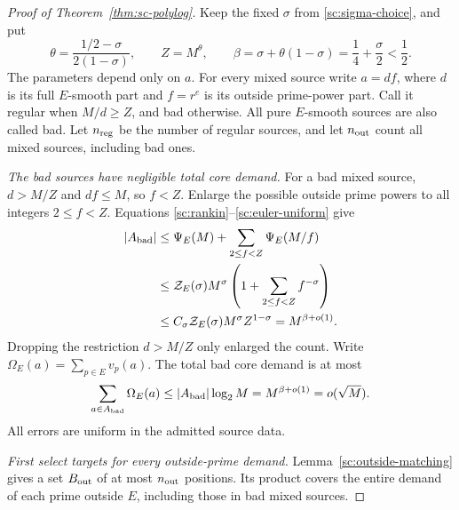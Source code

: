 \begin{proof}[Proof of Theorem~\ref{thm:sc-polylog}]
Keep the fixed \(\sigma\) from \eqref{sc:sigma-choice}, and put
\begin{equation}
 \theta=\frac{1/2-\sigma}{2(1-\sigma)},\qquad
 Z=M^\theta,\qquad
 \beta=\sigma+\theta(1-\sigma)=\frac14+\frac{\sigma}{2}<\frac12.
 \label{sc:cutoff}
\end{equation}
The parameters depend only on \(a\).
For every mixed source write \(a=d f\), where \(d\) is its full
\(E\)-smooth part and \(f=r^e\) is its outside prime-power part.
Call it regular when \(M/d\ge Z\), and bad otherwise.
All pure \(E\)-smooth sources are also called bad.
Let \(n_{\rm reg}\) be the number of regular sources, and let
\(n_{\rm out}\) count all mixed sources, including bad ones.

\emph{The bad sources have negligible total core demand.}
For a bad mixed source, \(d>M/Z\) and \(df\le M\), so \(f<Z\).
Enlarge the possible outside prime powers to all integers
\(2\le f<Z\). Equations \eqref{sc:rankin}--\eqref{sc:euler-uniform}
give
\begin{equation}
 \begin{split}
 |A_{\rm bad}|
 &\le\Psi_E(M)+\sum_{2\le f<Z}\Psi_E(M/f)\\
 &\le{\cal Z}_E(\sigma)M^\sigma
                    \left(1+\sum_{2\le f<Z}f^{-\sigma}\right)\\
 &\le C_\sigma{\cal Z}_E(\sigma)M^\sigma Z^{1-\sigma}
 =M^{\beta+o(1)}.
 \end{split}
 \label{sc:bad-count}
\end{equation}
Dropping the restriction \(d>M/Z\) only enlarged the count.
Write \(\Omega_E(a)=\sum_{p\in E}v_p(a)\).
The total bad core demand is at most
\begin{equation}
 \sum_{a\in A_{\rm bad}}\Omega_E(a)
 \le |A_{\rm bad}|\log_2M
 =M^{\beta+o(1)}
 =o(\sqrt M).
 \label{sc:bad-demand}
\end{equation}
All errors are uniform in the admitted source data.

\emph{First select targets for every outside-prime demand.}
Lemma~\ref{sc:outside-matching} gives a set \(B_{\rm out}\)
of at most \(n_{\rm out}\) positions. Its product covers the
entire demand of each prime outside \(E\), including those in
bad mixed sources.


\end{proof}
